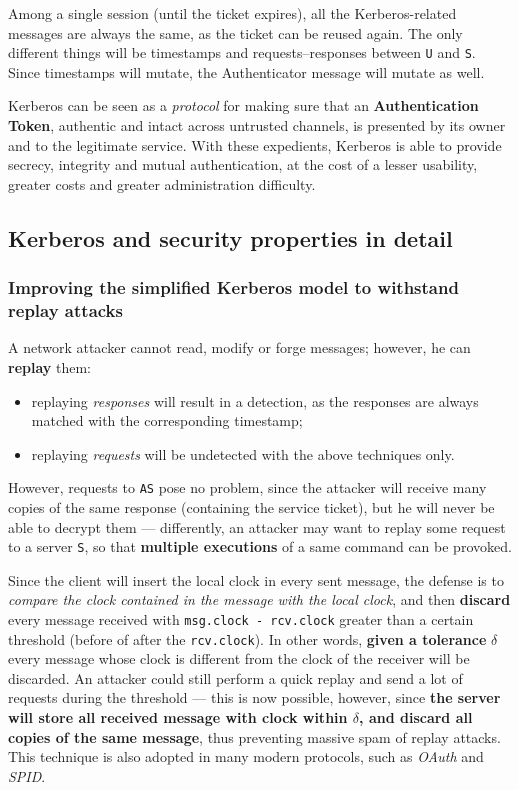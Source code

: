\documentclass[10pt]{\classname}
\begin{document}
Among a single session (until the ticket expires), all the Kerberos\--related
messages are always the same, as the ticket can be reused again. The only
different things will be timestamps and requests\---responses between
\texttt{U} and \texttt{S}. Since timestamps will mutate, the Authenticator
message will mutate as well.

Kerberos can be seen as a \emph{protocol} for making sure that an
\textbf{Authentication Token}, authentic and intact across untrusted channels,
is presented by its owner and to the legitimate service. With these expedients,
Kerberos is able to provide secrecy, integrity and mutual authentication, at
the cost of a lesser usability, greater costs and greater administration
difficulty.


\subsection{Kerberos and security properties in detail}
\subsubsection{Improving the simplified Kerberos model to withstand replay attacks}

A network attacker cannot read, modify or forge messages; however, he can
\textbf{replay} them:
\begin{itemize}
    \item replaying \emph{responses} will result in a detection, as the
        responses are always matched with the corresponding timestamp;
    \item replaying \emph{requests} will be undetected with the above
        techniques only.
\end{itemize}

However, requests to \texttt{AS} pose no problem, since the attacker will
receive many copies of the same response (containing the service ticket), but
he will never be able to decrypt them --- differently, an attacker may want to
replay some request to a server \texttt{S}, so that \textbf{multiple
executions} of a same command can be provoked.

Since the client will insert the local clock in every sent message, the defense
is to \emph{compare the clock contained in the message with the local clock},
and then \textbf{discard} every message received with \texttt{msg.clock -
rcv.clock} greater than a certain threshold (before of after the
\texttt{rcv.clock}). In other words, \textbf{given a tolerance} $\delta$ every
message whose clock is different from the clock of the receiver will be
discarded. An attacker could still perform a quick replay and send a lot of
requests during the threshold --- this is now possible, however, since
\textbf{the server will store all received message with clock within $\delta$,
and discard all copies of the same message}, thus preventing massive spam of
replay attacks. This technique is also adopted in many modern protocols, such
as \emph{OAuth} and \emph{SPID}.
\end{document}
